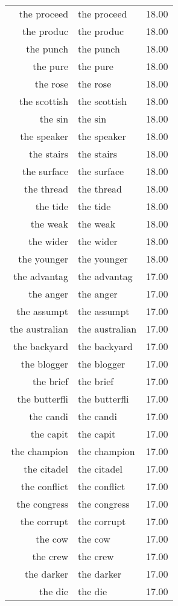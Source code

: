 \begin{table}[ht]
\begin{tabular}{rlr}
  the proceed & the proceed & 18.00 \\ 
  the produc & the produc & 18.00 \\ 
  the punch & the punch & 18.00 \\ 
  the pure & the pure & 18.00 \\ 
  the rose & the rose & 18.00 \\ 
  the scottish & the scottish & 18.00 \\ 
  the sin & the sin & 18.00 \\ 
  the speaker & the speaker & 18.00 \\ 
  the stairs & the stairs & 18.00 \\ 
  the surface & the surface & 18.00 \\ 
  the thread & the thread & 18.00 \\ 
  the tide & the tide & 18.00 \\ 
  the weak & the weak & 18.00 \\ 
  the wider & the wider & 18.00 \\ 
  the younger & the younger & 18.00 \\ 
  the advantag & the advantag & 17.00 \\ 
  the anger & the anger & 17.00 \\ 
  the assumpt & the assumpt & 17.00 \\ 
  the australian & the australian & 17.00 \\ 
  the backyard & the backyard & 17.00 \\ 
  the blogger & the blogger & 17.00 \\ 
  the brief & the brief & 17.00 \\ 
  the butterfli & the butterfli & 17.00 \\ 
  the candi & the candi & 17.00 \\ 
  the capit & the capit & 17.00 \\ 
  the champion & the champion & 17.00 \\ 
  the citadel & the citadel & 17.00 \\ 
  the conflict & the conflict & 17.00 \\ 
  the congress & the congress & 17.00 \\ 
  the corrupt & the corrupt & 17.00 \\ 
  the cow & the cow & 17.00 \\ 
  the crew & the crew & 17.00 \\ 
  the darker & the darker & 17.00 \\ 
  the die & the die & 17.00 \\ 

\end{tabular}
\end{table}
